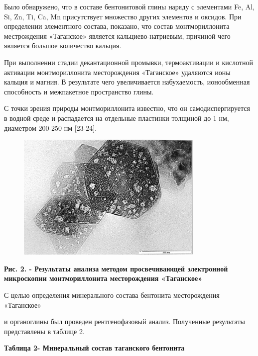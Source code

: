 Было обнаружено, что в составе бентонитовой глины наряду с элементами
Fe, Al, Si, Zn, Ti, Ca, Mn присутствует множество других элементов и
оксидов. При определении элементного состава, показано, что состав
монтмориллонита местрождения «Таганское» является кальциево-натриевым,
причиной чего является большое количество кальция.

При выполнении стадии декантационной промывки, термоактивации и
кислотной активации монтмориллонита месторождения «Таганское» удаляются
ионы кальция и магния. В результате чего увеличивается набухаемость,
ионообменная способность и межпакетное пространство глины.

С точки зрения природы монтмориллонита известно, что он
самодиспергируется в водной среде и распадается на отдельные пластинки
толщиной до 1 нм, диаметром 200-250 нм {[}23-24{]}.

\begin{figure}[H]
	\centering
	\includegraphics[width=0.8\textwidth]{assets/1015}
	\caption*{}
\end{figure}

\textbf{Рис. 2. - Результаты анализа методом просвечивающей электронной
микроскопии монтмориллонита месторождения «Таганское»}

С целью определения минерального состава бентонита месторождения
«Таганское»

и органоглины был проведен рентгенофазовый анализ. Полученные результаты
представлены в таблице 2.

\textbf{Таблица 2- Минеральный состав таганского бентонита}

